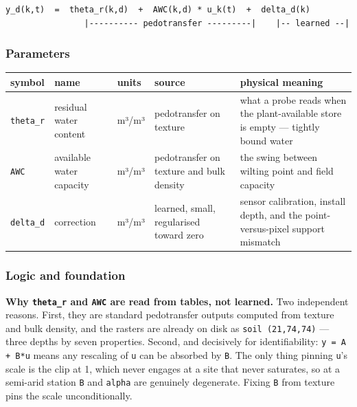 \documentclass[10pt,a4paper]{article}
\begin{document}
\begin{Verbatim}[fontsize=\scriptsize,frame=leftline,framerule=0.6pt,rulecolor=\color{rulegray},xleftmargin=6pt,framesep=6pt,]
   y_d(k,t)  =  theta_r(k,d)  +  AWC(k,d) * u_k(t)  +  delta_d(k)
                |---------- pedotransfer ---------|    |-- learned --|
\end{Verbatim}

\subsubsection*{Parameters}

\begin{center}
\footnotesize
\begin{tabularx}{\linewidth}{XXXXX}
\toprule
\textbf{symbol} & \textbf{name} & \textbf{units} & \textbf{source} & \textbf{physical meaning} \\
\midrule
\texttt{theta\_r} & residual water content & m³/m³ & pedotransfer on texture & what a probe reads when the plant-available store is empty — tightly bound water \\
\texttt{AWC} & available water capacity & m³/m³ & pedotransfer on texture and bulk density & the swing between wilting point and field capacity \\
\texttt{delta\_d} & correction & m³/m³ & learned, small, regularised toward zero & sensor calibration, install depth, and the point-versus-pixel support mismatch \\
\bottomrule
\end{tabularx}
\end{center}

\subsubsection*{Logic and foundation}

\textbf{Why \texttt{theta\_r} and \texttt{AWC} are read from tables, not learned.} Two independent
reasons. First, they are standard pedotransfer outputs computed from texture and
bulk density, and the rasters are already on disk as \texttt{soil (21,74,74)} — three
depths by seven properties. Second, and decisively for identifiability:
\texttt{y = A + B*u} means any rescaling of \texttt{u} can be absorbed by \texttt{B}. The only thing
pinning \texttt{u}'s scale is the clip at 1, which never engages at a site that never
saturates, so at a semi-arid station \texttt{B} and \texttt{alpha} are genuinely degenerate.
Fixing \texttt{B} from texture pins the scale unconditionally.
\end{document}
